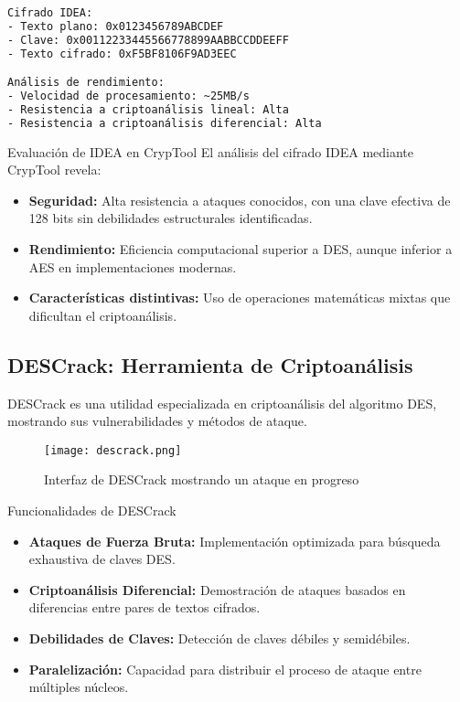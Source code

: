 \begin{lstlisting}[language=bash, caption={Resultado de Cifrado IDEA}, label=lst:idea-cifrado]
Cifrado IDEA:
- Texto plano: 0x0123456789ABCDEF
- Clave: 0x00112233445566778899AABBCCDDEEFF
- Texto cifrado: 0xF5BF8106F9AD3EEC

Análisis de rendimiento:
- Velocidad de procesamiento: ~25MB/s
- Resistencia a criptoanálisis lineal: Alta
- Resistencia a criptoanálisis diferencial: Alta
\end{lstlisting}

\begin{cryptoanalysis}{Evaluación de IDEA en CrypTool}
	El análisis del cifrado IDEA mediante CrypTool revela:

	\begin{itemize}
		\item \textbf{Seguridad:} Alta resistencia a ataques conocidos, con una clave efectiva de 128 bits sin debilidades estructurales identificadas.

		\item \textbf{Rendimiento:} Eficiencia computacional superior a DES, aunque inferior a AES en implementaciones modernas.

		\item \textbf{Características distintivas:} Uso de operaciones matemáticas mixtas que dificultan el criptoanálisis.
	\end{itemize}
\end{cryptoanalysis}

\subsection{DESCrack: Herramienta de Criptoanálisis}

DESCrack es una utilidad especializada en criptoanálisis del algoritmo DES, mostrando sus vulnerabilidades y métodos de ataque.

\begin{figure}[ht]
	\centering
	\texttt{[image: descrack.png]}
	\caption{Interfaz de DESCrack mostrando un ataque en progreso}
	\label{fig:descrack}
\end{figure}

\begin{cryptomethod}{Funcionalidades de DESCrack}
	\begin{itemize}
		\item \textbf{Ataques de Fuerza Bruta:} Implementación optimizada para búsqueda exhaustiva de claves DES.

		\item \textbf{Criptoanálisis Diferencial:} Demostración de ataques basados en diferencias entre pares de textos cifrados.

		\item \textbf{Debilidades de Claves:} Detección de claves débiles y semidébiles.

		\item \textbf{Paralelización:} Capacidad para distribuir el proceso de ataque entre múltiples núcleos.
	\end{itemize}
\end{cryptomethod}

